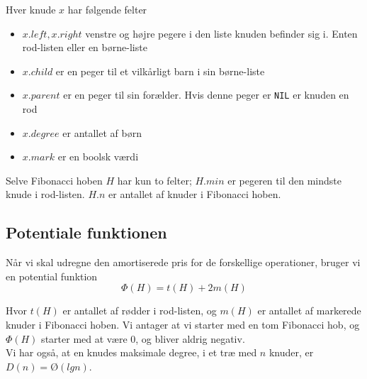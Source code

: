 Hver knude $x$ har følgende felter
\begin{itemize}
    \item $x.left, x.right$ venstre og højre pegere i den liste knuden befinder sig i. Enten rod-listen eller en børne-liste
    \item $x.child$ er en peger til et vilkårligt barn i sin børne-liste
    \item $x.parent$ er en peger til sin forælder. Hvis denne peger er \texttt{NIL} er knuden en rod
    \item $x.degree$ er antallet af børn
    \item $x.mark$ er en boolsk værdi
\end{itemize}

Selve Fibonacci hoben $H$ har kun to felter; $H.min$ er pegeren til den mindste knude i rod-listen. $H.n$ er antallet af knuder i Fibonacci hoben.

\subsection{Potentiale funktionen}
Når vi skal udregne den amortiserede pris for de forskellige operationer, bruger vi en potential funktion
$$\Phi(H) = t(H) + 2m(H)$$

Hvor $t(H)$ er antallet af rødder i rod-listen, og $m(H)$ er antallet af markerede knuder i Fibonacci hoben. Vi antager at vi starter med en tom Fibonacci hob, og $\Phi(H)$ starter med at være 0, og bliver aldrig negativ.\\
Vi har også, at en knudes maksimale degree, i et træ med $n$ knuder, er $D(n) = Ø(lgn)$.

